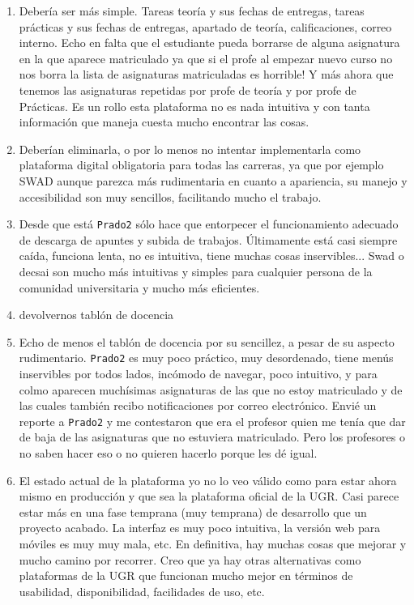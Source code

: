 \begin{enumerate}
\item Debería ser más simple. Tareas teoría y sus fechas de entregas, tareas prácticas y sus fechas de entregas, apartado de teoría, calificaciones, correo interno. Echo en falta que el estudiante pueda borrarse de alguna asignatura en la que aparece matriculado ya que si el profe al empezar nuevo curso no nos borra la lista de asignaturas matriculadas es horrible! Y más ahora que tenemos las asignaturas repetidas por profe de teoría y por profe de Prácticas. Es un rollo esta plataforma no es nada intuitiva y con tanta información que maneja cuesta mucho encontrar las cosas.
\item Deberían eliminarla, o por lo menos no intentar implementarla como plataforma digital obligatoria para todas las carreras, ya que por ejemplo SWAD aunque parezca más rudimentaria en cuanto a apariencia, su manejo y accesibilidad son muy sencillos, facilitando mucho el trabajo.
\item Desde que está \texttt{Prado2} sólo hace que entorpecer el funcionamiento adecuado de descarga de apuntes y subida de trabajos. Últimamente está casi siempre caída, funciona lenta, no es intuitiva, tiene muchas cosas inservibles... Swad o decsai son mucho más intuitivas y simples para cualquier persona de la comunidad universitaria y mucho más eficientes.
\item devolvernos tablón de docencia
\item Echo de menos el tablón de docencia por su sencillez, a pesar de su aspecto rudimentario. \texttt{Prado2} es muy poco práctico, muy desordenado, tiene menús inservibles por todos lados, incómodo de navegar, poco intuitivo, y para colmo aparecen muchísimas asignaturas de las que no estoy matriculado y de las cuales también recibo notificaciones por correo electrónico. Envié un reporte a \texttt{Prado2} y me contestaron que era el profesor quien me tenía que dar de baja de las asignaturas que no estuviera matriculado. Pero los profesores o no saben hacer eso o no quieren hacerlo porque les dé igual.
\item El estado actual de la plataforma yo no lo veo válido como para estar ahora mismo en producción y que sea la plataforma oficial de la UGR. Casi parece estar más en una fase temprana (muy temprana) de desarrollo que un proyecto acabado. La interfaz es muy poco intuitiva, la versión web para móviles es muy muy mala, etc. En definitiva, hay muchas cosas que mejorar y mucho camino por recorrer. Creo que ya hay otras alternativas como plataformas de la UGR que funcionan mucho mejor en términos de usabilidad, disponibilidad, facilidades de uso, etc.

\end{enumerate}
